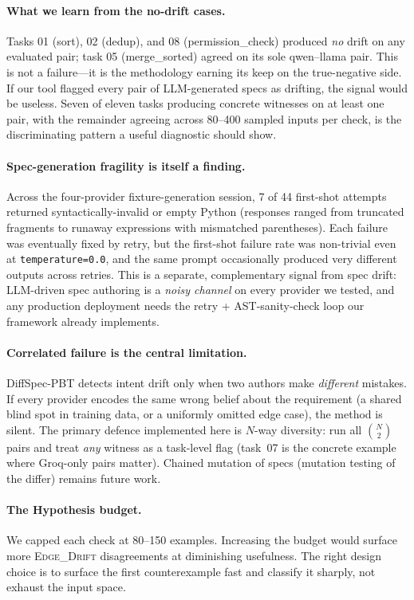 \documentclass[11pt,a4paper]{article}
\begin{document}
\paragraph{What we learn from the no-drift cases.} Tasks 01 (sort),
02 (dedup), and 08 (permission\_check) produced \emph{no} drift on
any evaluated pair; task 05 (merge\_sorted) agreed on its sole
qwen--llama pair. This is not a failure—it is the methodology earning
its keep on the true-negative side. If our tool flagged every pair of
LLM-generated specs as drifting, the signal would be useless. Seven
of eleven tasks producing concrete witnesses on at least one pair,
with the remainder agreeing across 80–400 sampled inputs per check,
is the discriminating pattern a useful diagnostic should show.

\paragraph{Spec-generation fragility is itself a finding.}
Across the four-provider fixture-generation session, 7 of 44 first-shot
attempts returned syntactically-invalid or empty Python (responses
ranged from truncated fragments to runaway expressions with
mismatched parentheses). Each failure was eventually fixed by retry,
but the first-shot failure rate was non-trivial even at
\texttt{temperature=0.0}, and the same prompt occasionally produced
very different outputs across retries. This is a separate,
complementary signal from spec drift: LLM-driven spec authoring is a
\emph{noisy channel} on every provider we tested, and any production
deployment needs the retry + AST-sanity-check loop our framework
already implements.

\paragraph{Correlated failure is the central limitation.}
DiffSpec-PBT detects intent drift only when two authors make
\emph{different} mistakes. If every provider encodes the same wrong
belief about the requirement (a shared blind spot in training data,
or a uniformly omitted edge case), the method is silent. The primary
defence implemented here is $N$-way diversity: run all
$\binom{N}{2}$ pairs and treat \emph{any} witness as a task-level
flag (task~07 is the concrete example where Groq-only pairs matter).
Chained mutation of specs (mutation testing of the differ) remains
future work.

\paragraph{The Hypothesis budget.} We capped each check at
80–150 examples. Increasing the budget would surface more
\textsc{Edge\_Drift} disagreements at diminishing usefulness. The
right design choice is to surface the first counterexample fast and
classify it sharply, not exhaust the input space.
\end{document}
